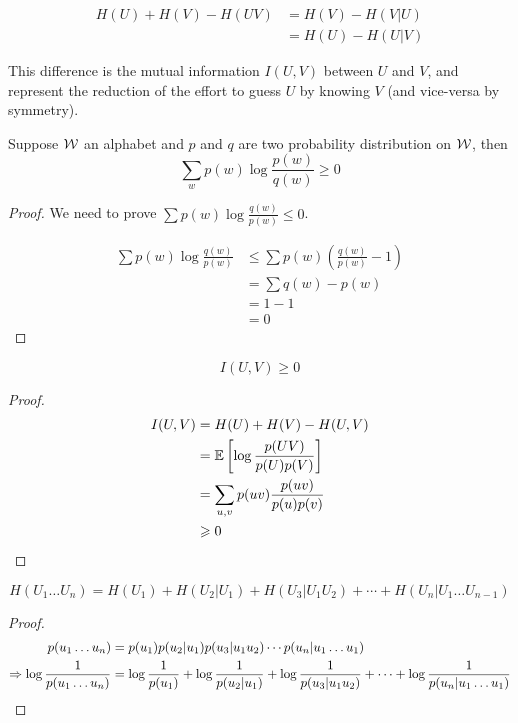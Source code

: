 \begin{definition}
\[
    \begin{aligned}
        H(U) + H(V) - H(UV) &= H(V) - H(V\vert U)\\
        &= H(U) - H(U\vert V)
    \end{aligned}
\]

This difference is the mutual information $I(U,V)$ between $U$ and $V$, and represent the reduction of the effort to guess $U$ by knowing $V$ (and vice-versa by symmetry).
\end{definition}

\begin{lemma}
    Suppose $\mathcal{W}$ an alphabet and $p$ and $q$ are two probability distribution on $\mathcal{W}$, then
    \[
        \sum\limits_w p(w) \log \frac{p(w)}{q(w)}\geqslant 0
    \]
\end{lemma}
\begin{proof}
    We need to prove $\sum p(w) \log \frac{q(w)}{p(w)} \leqslant 0$.
    
    \[
        \begin{aligned}
            \sum p(w) \log \frac{q(w)}{p(w)} &\leqslant \sum p(w) (\frac{q(w)}{p(w)}-1)\\
            &= \sum q(w) - p(w)\\
            &= 1-1\\
            &= 0
        \end{aligned}            
    \]
\end{proof}

\begin{theorem}
    \[
        I(U,V) \geqslant 0    
    \]
\end{theorem}
\begin{proof}
    \[
        \begin{aligned}
            I(U,V) &= H(U) + H(V) - H(U,V)\\
            &= \mathbb{E}\left[ \log\frac{p(UV)}{p(U)p(V)} \right]\\
            &= \sum\limits_{u,v} p(uv) \frac{p(uv)}{p(u)p(v)}\\
          &\geqslant 0  
        \end{aligned}            
    \]
\end{proof}

\begin{theorem}
    \[
        H(U_1\ldots U_n) = H(U_1) + H(U_2\vert U_1) + H(U_3\vert U_1 U_2) + \cdots + H(U_n \vert U_1\ldots U_{n-1})
    \]
\end{theorem}
\begin{proof}
    \[
        \begin{aligned}
            p(u_1\ldots u_n) &= p(u_1) p(u_2 \vert u_1) p(u_3\vert u_1u_2) \cdots p(u_n \vert u_1\ldots u_1)\\
            \Rightarrow \log\frac{1}{p(u_1\ldots u_n)} &= \log\frac{1}{p(u_1)} +  \log\frac{1}{p(u_2 \vert u_1)}+ \log\frac{1}{p(u_3\vert u_1u_2)} + \cdots + \log\frac{1}{p(u_n \vert u_1\ldots u_1)}
        \end{aligned}
    \]
\end{proof}

